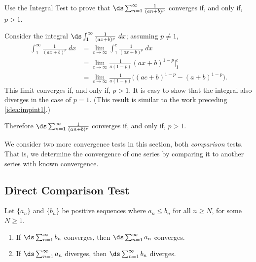 {
Use the Integral Test to prove that $\ds \sum_{n=1}^\infty \frac1{(an+b)^p}$ converges if, and only if, $p>1$.
}
{Consider the integral $\ds\int_1^\infty \frac1{(ax+b)^p}\ dx$; assuming $p\neq 1$,
\begin{align*}
\int_1^\infty \frac1{(ax+b)^p}\ dx &= \lim_{c\to\infty} \int_1^c \frac1{(ax+b)^p}\ dx \\
		&= \lim_{c\to\infty} \frac{1}{a(1-p)}(ax+b)^{1-p}\Big|_1^c\\
		&= \lim_{c\to\infty} \frac{1}{a(1-p)}\big((ac+b)^{1-p}-(a+b)^{1-p}\big).
\end{align*}
This limit converges if, and only if, $p>1$. It is easy to show that the integral also diverges in the case of $p=1$. (This result is similar to the work preceding \autoref{idea:impint1}.)

Therefore $\ds \sum_{n=1}^\infty \frac 1{(an+b)^p}$ converges if, and only if, $p>1$.}

We consider two more convergence tests in this section, both \textit{comparison} tests. That is, we determine the convergence of one series by  comparing it to another series with known convergence. 

\subsection*{Direct Comparison Test}

{Let $\{a_n\}$ and $\{b_n\}$ be positive sequences where $a_n\leq b_n$ for all $n\geq N$, for some $N\geq 1$. 
	\begin{enumerate}
		\item If $\ds \sum_{n=1}^\infty b_n$ converges, then $\ds \sum_{n=1}^\infty a_n$ converges.
		\item	If $\ds \sum_{n=1}^\infty a_n$ diverges, then $\ds \sum_{n=1}^\infty b_n$ diverges.
	\end{enumerate}
}


